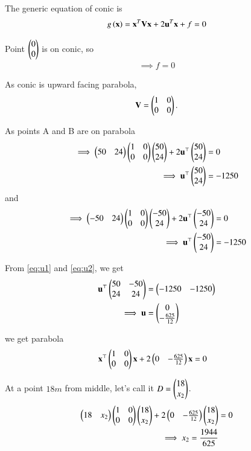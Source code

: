 \documentclass[journal,12pt,twocolumn]{IEEEtran}
\renewcommand{\vec}[1]{\boldsymbol{\mathbf{#1}}}
\begin{document}
The generic equation of conic is
\begin{align}
    \label{eq:1} g\brak{\vec{x}} = \vec{x}^T\vec{V}\vec{x} + 2\vec{u}^T\vec{x} + f = 0 
\end{align}

Point $\begin{pmatrix}0\\0\end{pmatrix}$ is on conic, so
\begin{align}
    \implies f = 0
\end{align}

As conic is upward facing parabola,
\begin{align}
    \vec{V} = \myvec{1&0\\0&0}.
\end{align}

As points A and B are on parabola
\begin{align}
    \implies \myvec{50&24}\myvec{1&0\\0&0}\myvec{50\\24} + 2\vec{u}^\top\myvec{50\\24} &= 0\\
    \label{eq:u1} \implies \vec{u}^{\top}\myvec{50\\24} &= -1250
\end{align}
and
\begin{align}
    \implies \myvec{-50&24}\myvec{1&0\\0&0}\myvec{-50\\24} + 2\vec{u}^\top\myvec{-50\\24} &= 0\\
    \label{eq:u2} \implies \vec{u}^{\top}\myvec{-50\\24} &= -1250
\end{align}

From \eqref{eq:u1} and \eqref{eq:u2}, we get
\begin{align}
    \vec{u}^\top\myvec{50&-50\\24&24} &= \myvec{-1250&-1250}\\
    \implies \vec{u} &= \myvec{0\\-\frac{625}{12}}
\end{align} 

we get parabola
\begin{align}
    \label{eq:parab1} \vec{x}^\top\myvec{1&0\\0&0}\vec{x} + 2\myvec{0 & -\frac{625}{12}}\vec{x} &= 0 
\end{align}

At a point $18 m$ from middle, let's call it $D = \begin{pmatrix}18\\x_2\end{pmatrix}$.
\begin{align}
    \begin{pmatrix}18&x_2\end{pmatrix}\begin{pmatrix}1&0\\0&0\end{pmatrix}\begin{pmatrix}18\\x_2\end{pmatrix} + 2\begin{pmatrix}0 & -\frac{625}{12}\end{pmatrix}\begin{pmatrix}18\\x_2\end{pmatrix} &= 0\\
    \implies x_2 = \frac{1944}{625} 
\end{align}
\end{document}
